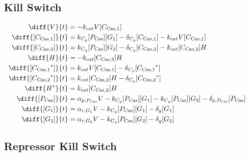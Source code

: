 \subsection{Kill Switch}
\label{s:Kill_Switch}

\begin{align}
\diff{\vectorGen{}}{t} & = - \casCutRate{{}}\vectorGen{}\conc{\cplx{\cas}{1}}\\
\diff{\conc{\cplx{\cas}{1}}}{t} & =  \gRnaBind{}\conc{\proSp{\cas{}}}\conc{\gRna{1}} - \casCompDegradeRate{}\conc{\cplx{\cas}{1}} - \casCutRate{{}}\vectorGen{}\conc{\cplx{\cas}{1}}\\
\diff{\conc{\cplx{\cas}{2}}}{t} & =  \gRnaBind{}\conc{\proSp{\cas{}}}\conc{\gRna{2}} - \casCompDegradeRate{}\conc{\cplx{\cas}{2}} - \casCutRate{{}}\conc{\cplx{\cas}{2}}\hostGen{}\\
\diff{\hostGen{}}{t} & = - \casCutRate{{}}\conc{\cplx{\cas}{2}}\hostGen{}\\
\diff{\conc{\bound{\cplx{\cas}{1}}}}{t} & =  \casCutRate{{}}\vectorGen{}\conc{\cplx{\cas}{1}} - \casCompDegradeRate{}\conc{\bound{\cplx{\cas}{1}}}\\
\diff{\conc{\bound{\cplx{\cas}{2}}}}{t} & =  \casCutRate{{}}\conc{\cplx{\cas}{2}}\hostGen{} - \casCompDegradeRate{}\conc{\bound{\cplx{\cas}{2}}}\\
\diff{\edited{\hostGen{}}}{t} & =  \casCutRate{{}}\conc{\cplx{\cas}{2}}\hostGen{}\\
\diff{\conc{\proSp{\cas{}}}}{t} & =  \txtlRate{\proSp{\cas{}}}\vectorGen{} - \gRnaBind{}\conc{\proSp{\cas{}}}\conc{\gRna{1}} - \gRnaBind{}\conc{\proSp{\cas{}}}\conc{\gRna{2}} - \proDegradeRate{\proSp{\cas{}}}\conc{\proSp{\cas{}}}\\
\diff{\conc{\gRna{1}}}{t} & =  \txRate{\gRna{1}}\vectorGen{} - \gRnaBind{}\conc{\proSp{\cas{}}}\conc{\gRna{1}} - \rnaDegradeRate{}\conc{\gRna{1}}\\
\diff{\conc{\gRna{2}}}{t} & =  \txRate{\gRna{2}}\vectorGen{} - \gRnaBind{}\conc{\proSp{\cas{}}}\conc{\gRna{2}} - \rnaDegradeRate{}\conc{\gRna{2}}
\end{align}

\subsection{Repressor Kill Switch}
\label{s:Repressor_Kill_Switch}

